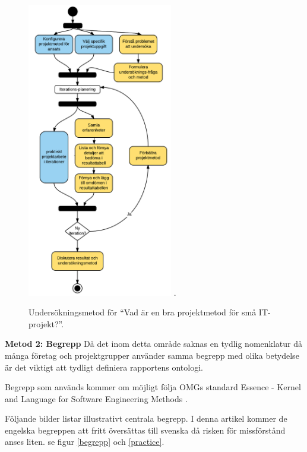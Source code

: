 \documentclass[conference,a4paper]{IEEEtran}
\begin{document}
\begin{figure}[H]
\centering
\includegraphics[width=2.5in]{invmethod}
\DeclareGraphicsExtensions.
\caption{Undersökningsmetod för ``Vad är en bra projektmetod för små IT-projekt?''.}
\label{undersokningsmetod}
\end{figure}

\textbf{Metod 2: Begrepp} Då det inom detta område saknas en tydlig nomenklatur då många företag och projektgrupper använder samma begrepp med olika betydelse är det viktigt att tydligt definiera rapportens ontologi.

Begrepp som används kommer om möjligt följa OMGs \cite{OMG} standard Essence - Kernel and Language for Software Engineering Methods \cite{Jacobson13}.

Följande bilder listar illustrativt centrala begrepp. I denna artikel kommer de engelska begreppen att fritt översättas till svenska då risken för missförstånd anses liten. se figur \ref{begrepp} och \ref{practice}.
\end{document}
